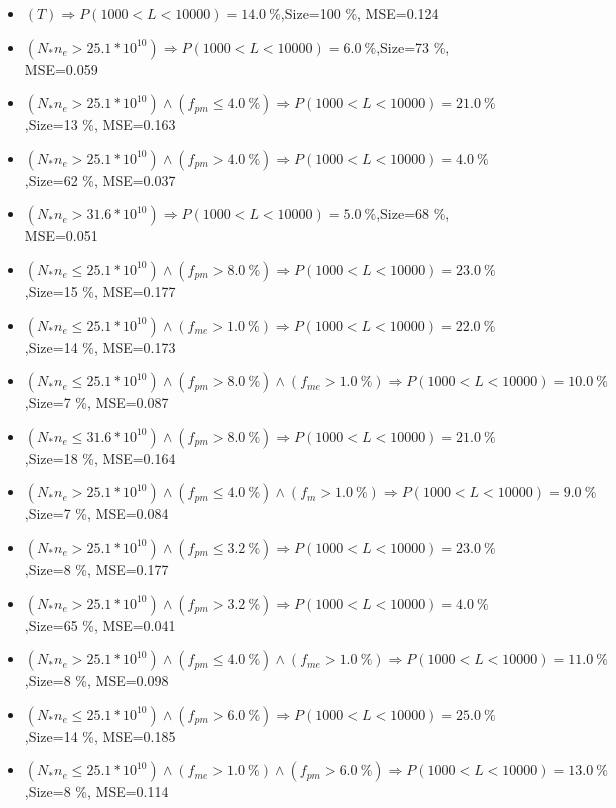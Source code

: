 \documentclass[numbered]{CSL}
\begin{document}
\begin{itemize}
\item $(T) \Rightarrow P(1 000 < L < 10 000) = 14.0~\%$,\hfill Size=100 \%, MSE=0.124
\item $(N_* n_e > 25.1 * 10^{10}) \Rightarrow P(1 000 < L < 10 000) = 6.0~\%$,\hfill Size=73 \%, MSE=0.059
\item $(N_* n_e > 25.1 * 10^{10}) \land (f_{pm} \leq 4.0~\%) \Rightarrow P(1 000 < L < 10 000) = 21.0~\%$,\hfill Size=13 \%, MSE=0.163
\item $(N_* n_e > 25.1 * 10^{10}) \land (f_{pm} > 4.0~\%) \Rightarrow P(1 000 < L < 10 000) = 4.0~\%$,\hfill Size=62 \%, MSE=0.037
\item $(N_* n_e > 31.6 * 10^{10}) \Rightarrow P(1 000 < L < 10 000) = 5.0~\%$,\hfill Size=68 \%, MSE=0.051
\item $(N_* n_e \leq 25.1 * 10^{10}) \land (f_{pm} > 8.0~\%) \Rightarrow P(1 000 < L < 10 000) = 23.0~\%$,\hfill Size=15 \%, MSE=0.177
\item $(N_* n_e \leq 25.1 * 10^{10}) \land (f_{me} > 1.0~\%) \Rightarrow P(1 000 < L < 10 000) = 22.0~\%$,\hfill Size=14 \%, MSE=0.173
\item $(N_* n_e \leq 25.1 * 10^{10}) \land (f_{pm} > 8.0~\%) \land (f_{me} > 1.0~\%) \Rightarrow P(1 000 < L < 10 000) = 10.0~\%$,\hfill Size=7 \%, MSE=0.087
\item $(N_* n_e \leq 31.6 * 10^{10}) \land (f_{pm} > 8.0~\%) \Rightarrow P(1 000 < L < 10 000) = 21.0~\%$,\hfill Size=18 \%, MSE=0.164
\item $(N_* n_e > 25.1 * 10^{10}) \land (f_{pm} \leq 4.0~\%) \land (f_m > 1.0~\%) \Rightarrow P(1 000 < L < 10 000) = 9.0~\%$,\hfill Size=7 \%, MSE=0.084
\item $(N_* n_e > 25.1 * 10^{10}) \land (f_{pm} \leq 3.2~\%) \Rightarrow P(1 000 < L < 10 000) = 23.0~\%$,\hfill Size=8 \%, MSE=0.177
\item $(N_* n_e > 25.1 * 10^{10}) \land (f_{pm} > 3.2~\%) \Rightarrow P(1 000 < L < 10 000) = 4.0~\%$,\hfill Size=65 \%, MSE=0.041
\item $(N_* n_e > 25.1 * 10^{10}) \land (f_{pm} \leq 4.0~\%) \land (f_{me} > 1.0~\%) \Rightarrow P(1 000 < L < 10 000) = 11.0~\%$,\hfill Size=8 \%, MSE=0.098
\item $(N_* n_e \leq 25.1 * 10^{10}) \land (f_{pm} > 6.0~\%) \Rightarrow P(1 000 < L < 10 000) = 25.0~\%$,\hfill Size=14 \%, MSE=0.185
\item $(N_* n_e \leq 25.1 * 10^{10}) \land (f_{me} > 1.0~\%) \land (f_{pm} > 6.0~\%) \Rightarrow P(1 000 < L < 10 000) = 13.0~\%$,\hfill Size=8 \%, MSE=0.114

\end{itemize}
\end{document}
